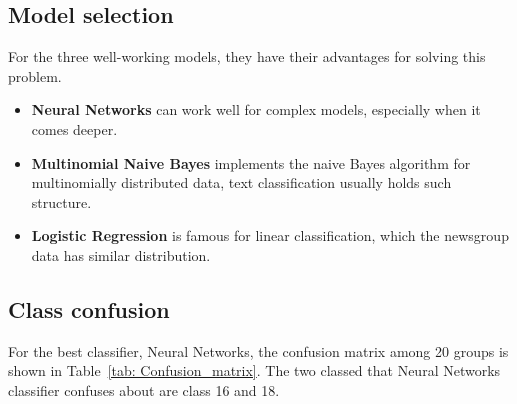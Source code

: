 \documentclass[a4paper]{article}
\begin{document}
\subsection{Model selection}

For the three well-working models, they have their advantages for solving this problem.

\begin{itemize}
    \item \textbf{Neural Networks} can work well for complex models, especially when it comes deeper.
    \item \textbf{Multinomial Naive Bayes} implements the naive Bayes algorithm for multinomially distributed data, text classification usually holds such structure.
    \item \textbf{Logistic Regression} is famous for linear classification, which the newsgroup data has similar distribution.
\end{itemize}

\subsection{Class confusion}

For the best classifier, Neural Networks, the confusion matrix among 20 groups is shown in Table~\ref{tab: Confusion_matrix}. The two classed that Neural Networks classifier confuses about are class 16 and 18.
\end{document}
